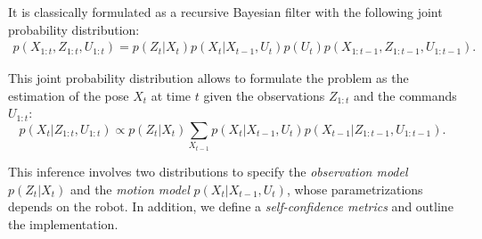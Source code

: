 \documentclass{svmult}
\begin{document}
It is classically formulated as a recursive Bayesian filter with the following joint probability distribution:
\begin{equation}
\begin{split}
p(X_{1:t}, Z_{1:t}, U_{1:t}) = p(Z_t|X_t) p(X_t|X_{t-1}, U_{t}) p(U_t) p(X_{1:t-1}, Z_{1:t-1}, U_{1:t-1}).
\end{split}
\end{equation}

This joint probability distribution allows to formulate the problem as the estimation of the pose $X_t$ at time $t$ given the observations $Z_{1:t}$ and the commands $U_{1:t}$:
\begin{equation}
p(X_t|Z_{1:t},U_{1:t}) \propto p(Z_t | X_t) \sum_{X_{t-1}} p(X_t|X_{t-1}, U_t) p(X_{t-1} | Z_{1:t-1}, U_{1:t-1}).
\end{equation}

This inference involves two distributions to specify the \emph{observation model} $p(Z_t | X_t)$ and the \emph{motion model} $p(X_t|X_{t-1}, U_t)$, whose parametrizations depends on the robot.
In addition, we define a \emph{self-confidence metrics} and outline the implementation.

\end{document}
